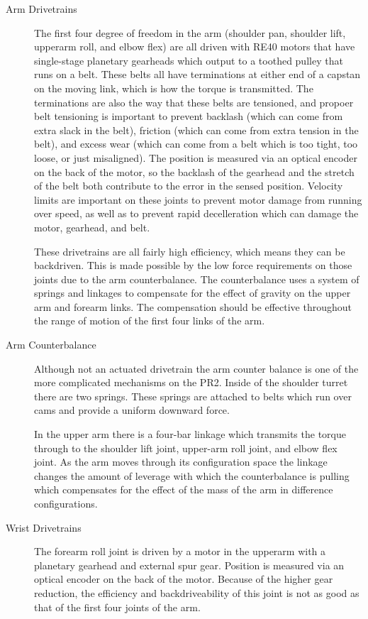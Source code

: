 \begin{description}
\item[Arm Drivetrains]
The first four degree of freedom in the arm (shoulder pan, shoulder lift, upperarm roll, and elbow flex) are all driven with RE40 motors that have single-stage planetary gearheads which output to a toothed pulley that runs on a belt.  These belts all have terminations at either end of a capstan on the moving link, which is how the torque is transmitted.  The terminations are also the way that these belts are tensioned, and propoer belt tensioning is important to prevent backlash (which can come from extra slack in the belt), friction (which can come from extra tension in the belt), and excess wear (which can come from a belt which is too tight, too loose, or just misaligned).  The position is measured via an optical encoder on the back of the motor, so the backlash of the gearhead and the stretch of the belt both contribute to the error in the sensed position.  Velocity limits are important on these joints to prevent motor damage from running over speed, as well as to prevent rapid decelleration which can damage the motor, gearhead, and belt.

These drivetrains are all fairly high efficiency, which means they can be backdriven.  This is made possible by the low force requirements on those joints due to the arm counterbalance.  The counterbalance uses a system of springs and linkages to compensate for the effect of gravity on the upper arm and forearm links.  The compensation should be effective throughout the range of motion of the first four links of the arm.

\item[Arm Counterbalance]
Although not an actuated drivetrain the arm counter balance is one of
the more complicated mechanisms on the PR2. Inside of the shoulder
turret there are two springs.  These springs are attached to belts
which run over cams and provide a uniform downward force.

In the upper arm there is a four-bar linkage which transmits the
torque through to the shoulder lift joint, upper-arm roll joint, and elbow flex joint.  As the arm moves through its
configuration space the linkage changes the amount of leverage with
which the counterbalance is pulling which compensates for the effect of the mass of the arm in difference configurations.

\item[Wrist Drivetrains]
The forearm roll joint is driven by a motor in the upperarm with a planetary gearhead and external spur gear.  Position is measured via an optical encoder on the back of the motor.  Because of the higher gear reduction, the efficiency and backdriveability of this joint is not as good as that of the first four joints of the arm.


\end{description}
